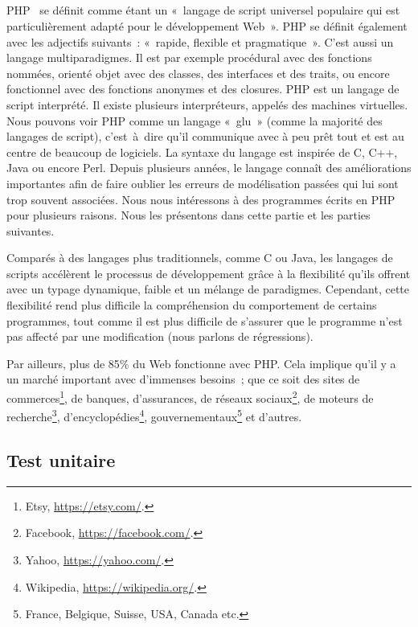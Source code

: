 \subsection{}

PHP~ se définit comme étant un «~langage de script universel
populaire qui est particulièrement adapté pour le développement Web~». PHP se
définit également avec les adjectifs suivants~: «~rapide, flexible et
pragmatique~». C'est aussi un langage multiparadigmes. Il est par exemple
procédural avec des fonctions nommées, orienté objet avec des classes, des
interfaces et des traits, ou encore fonctionnel avec des fonctions anonymes et
des closures. PHP est un langage de script interprété. Il existe plusieurs
interpréteurs, appelés des machines virtuelles. Nous pouvons voir PHP comme un
langage «~glu~» (comme la majorité des langages de script), c'est~à~dire qu'il
communique avec à peu prêt tout et est au centre de beaucoup de logiciels. La
syntaxe du langage est inspirée de C, C++, Java ou encore Perl.  Depuis
plusieurs années, le langage connaît des améliorations importantes afin de faire
oublier les erreurs de modélisation passées qui lui sont trop souvent associées.
Nous nous intéressons à des programmes écrits en PHP pour plusieurs raisons.
Nous les présentons dans cette partie et les parties suivantes.

Comparés à des langages plus traditionnels, comme C ou Java, les langages de
scripts accélèrent le processus de développement grâce à la flexibilité qu'ils
offrent avec un typage dynamique, faible et un mélange de paradigmes. Cependant,
cette flexibilité rend plus difficile la compréhension du comportement de
certains programmes, tout comme il est plus difficile de s'assurer que le
programme n'est pas affecté par une modification (nous parlons de régressions).

Par ailleurs, plus de 85\% du Web fonctionne avec PHP.  Cela implique qu'il y a
un marché important avec d'immenses besoins~; que ce soit des sites de
commerces\footnote{Etsy, \url{https://etsy.com/}.}, de banques, d'assurances, de
réseaux sociaux\footnote{Facebook, \url{https://facebook.com/}.}, de moteurs de
recherche\footnote{Yahoo, \url{https://yahoo.com/}.},
d'encyclopédies\footnote{Wikipedia, \url{https://wikipedia.org/}.},
gouvernementaux\footnote{France, Belgique, Suisse, USA, Canada etc.} et
d'autres.

\subsection{Test unitaire}

